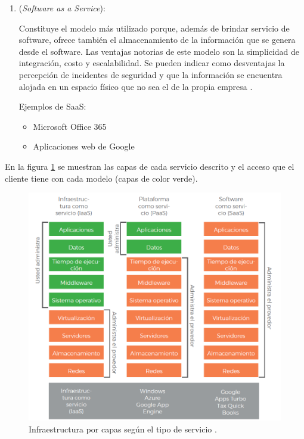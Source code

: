 \begin{enumerate}
\item {} (\emph{Software as a Service}): 

Constituye el modelo más utilizado porque, además de brindar servicio de software, ofrece también el almacenamiento de la información que se genera desde el software. Las ventajas notorias de este modelo son la simplicidad de integración, costo y escalabilidad. Se pueden indicar como desventajas la percepción de incidentes de seguridad y que la información se encuentra alojada en un espacio físico que no sea el de la propia empresa \citep{BOOK:2}. 

Ejemplos de SaaS:

\begin{itemize}
\item Microsoft Office 365
\item Aplicaciones web de Google
\end{itemize}

\vspace{0.5cm}

\end{enumerate}

En la figura \ref{fig:capas-servicios} se muestran las capas de cada servicio descrito y el acceso que el cliente tiene con cada modelo (capas de color verde).

\begin{figure}[htbp]
	\centering
	\includegraphics[width=.8\textwidth]{./Figures/capas-servicios.png}
	\caption{Infraestructura por capas según el tipo de servicio  \citep{BOOK:2}.}

	\label{fig:capas-servicios}
\end{figure}


